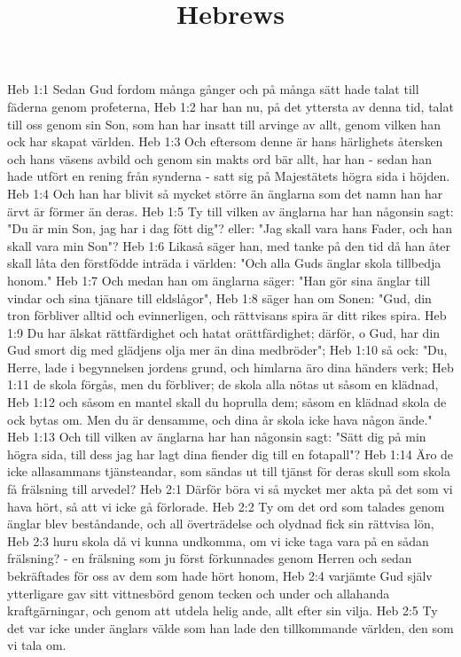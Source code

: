 

\title{Hebrews}

Heb 1:1  Sedan Gud fordom många gånger och på många sätt hade talat till fäderna genom profeterna,
Heb 1:2  har han nu, på det yttersta av denna tid, talat till oss genom sin Son, som han har insatt till arvinge av allt, genom vilken han ock har skapat världen.
Heb 1:3  Och eftersom denne är hans härlighets återsken och hans väsens avbild och genom sin makts ord bär allt, har han - sedan han hade utfört en rening från synderna - satt sig på Majestätets högra sida i höjden.
Heb 1:4  Och han har blivit så mycket större än änglarna som det namn han har ärvt är förmer än deras.
Heb 1:5  Ty till vilken av änglarna har han någonsin sagt: "Du är min Son, jag har i dag fött dig"? eller: "Jag skall vara hans Fader, och han skall vara min Son"?
Heb 1:6  Likaså säger han, med tanke på den tid då han åter skall låta den förstfödde inträda i världen: "Och alla Guds änglar skola tillbedja honom."
Heb 1:7  Och medan han om änglarna säger: "Han gör sina änglar till vindar och sina tjänare till eldslågor",
Heb 1:8  säger han om Sonen: "Gud, din tron förbliver alltid och evinnerligen, och rättvisans spira är ditt rikes spira.
Heb 1:9  Du har älskat rättfärdighet och hatat orättfärdighet; därför, o Gud, har din Gud smort dig med glädjens olja mer än dina medbröder";
Heb 1:10  så ock: "Du, Herre, lade i begynnelsen jordens grund, och himlarna äro dina händers verk;
Heb 1:11  de skola förgås, men du förbliver; de skola alla nötas ut såsom en klädnad,
Heb 1:12  och såsom en mantel skall du hoprulla dem; såsom en klädnad skola de ock bytas om. Men du är densamme, och dina år skola icke hava någon ände."
Heb 1:13  Och till vilken av änglarna har han någonsin sagt: "Sätt dig på min högra sida, till dess jag har lagt dina fiender dig till en fotapall"?
Heb 1:14  Äro de icke allasammans tjänsteandar, som sändas ut till tjänst för deras skull som skola få frälsning till arvedel?
Heb 2:1  Därför böra vi så mycket mer akta på det som vi hava hört, så att vi icke gå förlorade.
Heb 2:2  Ty om det ord som talades genom änglar blev beståndande, och all överträdelse och olydnad fick sin rättvisa lön,
Heb 2:3  huru skola då vi kunna undkomma, om vi icke taga vara på en sådan frälsning? - en frälsning som ju först förkunnades genom Herren och sedan bekräftades för oss av dem som hade hört honom,
Heb 2:4  varjämte Gud själv ytterligare gav sitt vittnesbörd genom tecken och under och allahanda kraftgärningar, och genom att utdela helig ande, allt efter sin vilja.
Heb 2:5  Ty det var icke under änglars välde som han lade den tillkommande världen, den som vi tala om.
